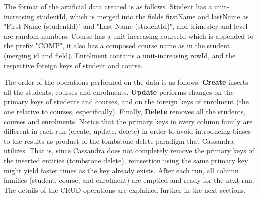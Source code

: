 The format of the artificial data created is as follows. Student has a
unit-increasing studentId, which is merged into the fields firstName and
lastName as "First Name (studentId)" and "Last Name (studentId)", and trimester
and level are random numbers. Course has a   unit-increasing courseId which is
appended to the prefix "COMP", it also has a composed course name as in
the student (merging id and field). Enrolment contains a unit-increasing rowId, and the
respective foreign keys of student and course.
		
The order of the operations performed on the data is as follows. \textbf{Create}
inserts all the students, courses and enrolments. \textbf{Update} performs
changes on the primary keys of students and courses, and on the foreign keys
of enrolment (the one relative to courses, especifically). Finally,
\textbf{Delete} removes all the students, courses and enrolments.  Notice that
the primary keys in every column family  are different in each run (create,
update, delete) in order to avoid  introducing biases to the results as product
of the tombstone delete paradigm  that Cassandra utilizes. That is, since
Cassandra does not completely  remove the primary keys of the inserted entities
(tombstone delete), reinsertion  using the same primary key might yield faster
times as the key already exists. After  each run, all column families (student,
course, and enrolment) are emptied and  ready for the next run.  The details  of
the \ac{CRUD} operations are explained further in the next sections.
		
